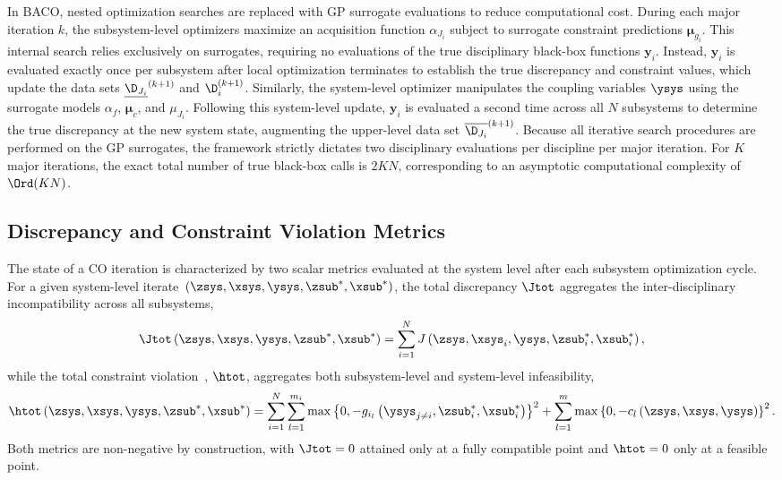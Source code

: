 In BACO, nested optimization searches are replaced with GP surrogate evaluations to reduce computational cost. During each major iteration \(k\), the subsystem-level optimizers maximize an acquisition function \(\alpha_{J_i}\) subject to surrogate constraint predictions \(\bm{\mu}_{g_i}\). This internal search relies exclusively on surrogates, requiring no evaluations of the true disciplinary black-box functions \(\bm{y}_i\). Instead, \(\bm{y}_i\) is evaluated exactly once per subsystem after local optimization terminates to establish the true discrepancy and constraint values, which update the data sets \(\underline{\D_{J_i}}^{(k+1)}\) and \(\D_i^{(k+1)}\). Similarly, the system-level optimizer manipulates the coupling variables \(\ysys\) using the surrogate models \(\alpha_f\), \(\bm{\mu}_c\), and \(\mu_{J_i}\). Following this system-level update, \(\bm{y}_i\) is evaluated a second time across all \(N\) subsystems to determine the true discrepancy at the new system state, augmenting the upper-level data set \(\overline{\D_{J_i}}^{(k+1)}\). Because all iterative search procedures are performed on the GP surrogates, the framework strictly dictates two disciplinary evaluations per discipline per major iteration. For \(K\) major iterations, the exact total number of true black-box calls is \(2KN\), corresponding to an asymptotic computational complexity of \(\Ord(KN)\).

\subsection{Discrepancy and Constraint Violation Metrics}\label{subsec:metrics}

The state of a CO iteration is characterized by two scalar metrics evaluated at the system level after each subsystem optimization cycle. For a given system-level iterate~\((\zsys, \xsys, \ysys, \zsub^*, \xsub^*)\), the total discrepancy \(\Jtot\) aggregates the inter-disciplinary incompatibility across all subsystems,
\begin{equation}
  \Jtot\left(
    \zsys,
    \xsys,
    \ysys,
    \zsub^*,
    \xsub^*
  \right) = \sum_{i=1}^N J\left(
    \zsys,
    \xsys_i,
    \ysys,
    \zsub_i^*,
    \xsub_i^*
  \right),\label{eqn:disc_total}
\end{equation}
while the total constraint violation~\cite{audet2017}, \(\htot\), aggregates both subsystem-level and system-level infeasibility,
\begin{equation}
  \htot\left(
    \zsys,
    \xsys,
    \ysys,
    \zsub^*,
    \xsub^*
  \right)
  = \sum_{i=1}^N \sum_{l=1}^{m_i} \max\left\{
    0, - g_{i_l}\left(
      \ysys_{j\neq i},
      \zsub_i^*,
      \xsub_i^*
    \right)
  \right\}^{2}
  + \sum_{l=1}^m \max\left\{
    0, - c_l\left(
      \zsys,
      \xsys,
      \ysys
    \right)
  \right\}^{2}.\label{eqn:constviol_total}
\end{equation}
Both metrics are non-negative by construction, with \(\Jtot = 0\) attained only at a fully compatible point and \(\htot = 0\) only at a feasible point.

